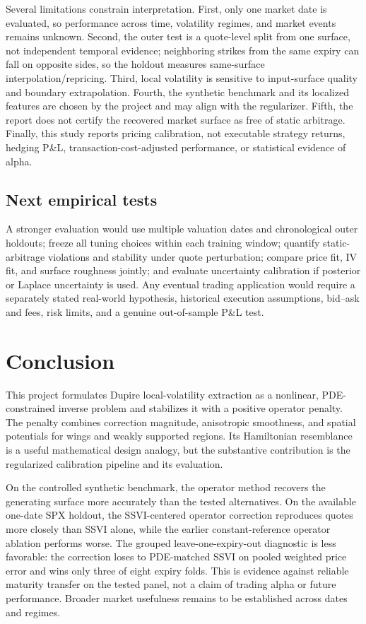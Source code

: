 \documentclass[11pt,a4paper]{article}
\begin{document}
Several limitations constrain interpretation. First, only one market date is evaluated, so performance across time, volatility regimes, and market events remains unknown. Second, the outer test is a quote-level split from one surface, not independent temporal evidence; neighboring strikes from the same expiry can fall on opposite sides, so the holdout measures same-surface interpolation/repricing. Third, local volatility is sensitive to input-surface quality and boundary extrapolation. Fourth, the synthetic benchmark and its localized features are chosen by the project and may align with the regularizer. Fifth, the report does not certify the recovered market surface as free of static arbitrage. Finally, this study reports pricing calibration, not executable strategy returns, hedging P\&L, transaction-cost-adjusted performance, or statistical evidence of alpha.

\subsection{Next empirical tests}
A stronger evaluation would use multiple valuation dates and chronological outer holdouts; freeze all tuning choices within each training window; quantify static-arbitrage violations and stability under quote perturbation; compare price fit, IV fit, and surface roughness jointly; and evaluate uncertainty calibration if posterior or Laplace uncertainty is used. Any eventual trading application would require a separately stated real-world hypothesis, historical execution assumptions, bid--ask and fees, risk limits, and a genuine out-of-sample P\&L test.

\section{Conclusion}\label{sec:conclusion}
This project formulates Dupire local-volatility extraction as a nonlinear, PDE-constrained inverse problem and stabilizes it with a positive operator penalty. The penalty combines correction magnitude, anisotropic smoothness, and spatial potentials for wings and weakly supported regions. Its Hamiltonian resemblance is a useful mathematical design analogy, but the substantive contribution is the regularized calibration pipeline and its evaluation.

On the controlled synthetic benchmark, the operator method recovers the generating surface more accurately than the tested alternatives. On the available one-date SPX holdout, the SSVI-centered operator correction reproduces quotes more closely than SSVI alone, while the earlier constant-reference operator ablation performs worse. The grouped leave-one-expiry-out diagnostic is less favorable: the correction loses to PDE-matched SSVI on pooled weighted price error and wins only three of eight expiry folds. This is evidence against reliable maturity transfer on the tested panel, not a claim of trading alpha or future performance. Broader market usefulness remains to be established across dates and regimes.
\end{document}
